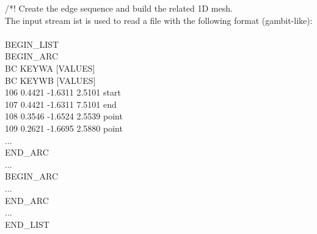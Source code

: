 \documentclass[a4paper]{report}
\newcommand\tab[1][1cm]{\hspace*{#1}}
\begin{document}
{\selectfont
/*!
 Create the edge sequence and build the related 1D mesh. \\
  The input stream ist is used to read a file with the following format (gambit-like): \\
\\
\tab		BEGIN\_\-LIST\\
\tab		BEGIN\_\-ARC \\
\tab		BC KEYWA [VALUES] \\
\tab		BC KEYWB [VALUES]\\
\tab		 106       0.4421      -1.6311       2.5101		start\\
\tab		 107       0.4421      -1.6311       7.5101		end  \\
\tab		 108       0.3546      -1.6524       2.5539		point\\
\tab		 109       0.2621      -1.6695       2.5880		point\\
\tab		... \\
\tab		END\_\-ARC \\
\tab		... \\
\tab		BEGIN\_\-ARC  \\
\tab		... \\
\tab		END\_\-ARC \\
\tab		... \\
\tab		END\_\-LIST \\

}
\end{document}
